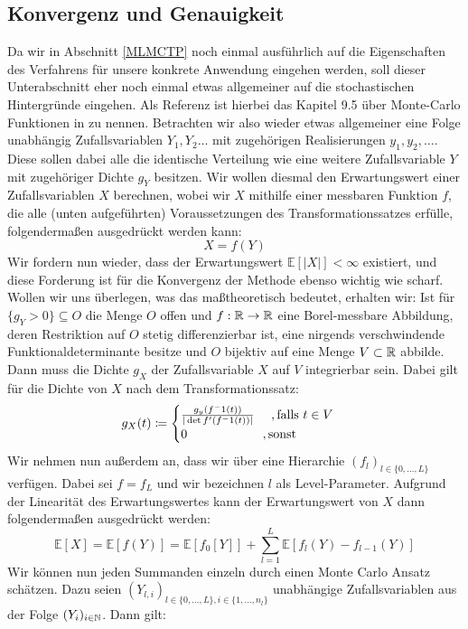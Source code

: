 \subsection{Konvergenz und Genauigkeit}
Da wir in Abschnitt \ref{MLMCTP} noch einmal ausführlich auf die Eigenschaften des Verfahrens für unsere konkrete Anwendung eingehen werden, soll dieser Unterabschnitt eher noch einmal etwas allgemeiner auf die stochastischen Hintergründe eingehen. Als Referenz ist hierbei das Kapitel 9.5 über Monte-Carlo Funktionen in \cite{sullivan2015introduction} zu nennen. 
Betrachten wir also wieder etwas allgemeiner eine Folge unabhängig Zufallsvariablen $ Y_{1},Y_{2}\dots$ mit zugehörigen Realisierungen $ y_{1}, y_{2},\dots $. Diese sollen dabei alle die identische Verteilung wie eine weitere Zufallsvariable $ Y $ mit zugehöriger Dichte $ g_Y $ besitzen.
Wir wollen diesmal den Erwartungswert einer Zufallsvariablen $ X $ berechnen, wobei wir $ X $ mithilfe einer messbaren Funktion $ f $, die alle (unten aufgeführten) Voraussetzungen des Transformationssatzes erfülle, folgendermaßen ausgedrückt werden kann:
\[
	X = f(Y)
\]
Wir fordern nun wieder, dass der Erwartungswert $ \mathbb{E}[|X|] < \infty $ existiert, und diese Forderung ist für die Konvergenz der Methode ebenso wichtig wie scharf. Wollen wir uns überlegen, was das maßtheoretisch bedeutet, erhalten wir:
Ist für  $  \{ g_Y > 0 \} \subseteq O $ die Menge $ O $ offen und $ f:\mathbb{R} \to \mathbb{R} $ eine Borel-messbare Abbildung, deren Restriktion auf $ O $ stetig differenzierbar ist, eine nirgends verschwindende Funktionaldeterminante besitze und $ O $ bijektiv auf eine Menge $ V \subset \mathbb{R} $ abbilde.
Dann muss die Dichte $ g_X $ der Zufallsvariable $ X $ auf $ V $ integrierbar sein. Dabei gilt für die Dichte von $ X $ nach dem Transformationssatz:
\[
 	g_X(t) \coloneqq 
 	\begin{cases}
 	\frac{g_y(f^-1(t))}{| \det f'(f^-1(t)) |} \ \quad ,\text{falls }t\in V\\
 	0 \qquad \qquad \qquad, \text{sonst} 	
 	\end{cases}
\]
Wir nehmen nun außerdem an, dass wir über eine Hierarchie 
$ (f_l)_{l \in \{ 0,\dots,L \} } $ verfügen. Dabei sei $ f = f_L $ und wir bezeichnen $ l $ als Level-Parameter.
Aufgrund der Linearität des Erwartungswertes kann der Erwartungswert von $ X $ dann folgendermaßen ausgedrückt werden:
\[
	\mathbb{E}[X] = \mathbb{E}[f(Y)] = \mathbb{E}[f_0[Y]] + \sum_{l=1}^{L} \mathbb{E}[f_l(Y) - f_{l-1}(Y)]
\]
Wir können nun jeden Summanden einzeln durch einen Monte Carlo Ansatz schätzen. Dazu seien $ (Y_{l,i})_{l\in\{0,\dots,L\},i \in \{1,\dots,n_l \} }  $ unabhängige Zufallsvariablen aus der Folge $ (Y_i)_{i \in \mathbb{N}} $. Dann gilt:
